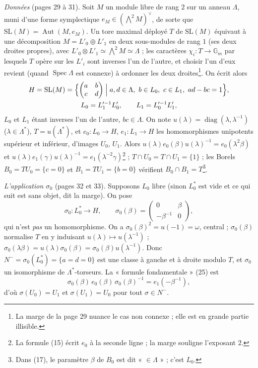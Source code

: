 \documentclass[11pt,a4paper]{article}
\begin{document}
\emph{Données} (pages 29 à 31). Soit $M$ un module libre de rang $2$ sur un
anneau $\Lambda$, muni d'une forme symplectique $e_M \in (\bigwedge^2 M)^{\vee}$,
de sorte que $\mathrm{SL}(M) = \operatorname{Aut}(M, e_M)$. Un tore maximal
déployé $T$ de $\mathrm{SL}(M)$ équivaut à une décomposition $M = L'_0 \oplus
L'_1$ en deux sous-modules de rang $1$ (ses deux droites propres), avec $L'_0
\otimes L'_1 \simeq \bigwedge^2 M \simeq \Lambda$ ; les caractères $\chi_i : T
\to \mathbb{G}_m$ par lesquels $T$ opère sur les $L'_i$ sont inverses l'un de
l'autre, et choisir l'un d'eux revient (quand $\operatorname{Spec}\Lambda$ est
connexe) à ordonner les deux droites\footnote{La marge de la page 29 nuance
le cas non connexe ; elle est en grande partie illisible.}. On écrit alors
\[
  \begin{gathered}
  H = \mathrm{SL}(M) = \Bigl\{\begin{pmatrix} a & b \\ c & d\end{pmatrix} \Bigm|
  a, d \in \Lambda,\ b \in L_0,\ c \in L_1,\ ad - bc = 1\Bigr\},\\
  L_0 = L_1'^{-1}L'_0,\qquad L_1 = L_0'^{-1}L'_1,
  \end{gathered}
\]
$L_0$ et $L_1$ étant inverses l'un de l'autre, $bc \in \Lambda$. On note
$u(\lambda) = \operatorname{diag}(\lambda, \lambda^{-1})$ ($\lambda \in
\Lambda^{*}$), $T = u(\Lambda^{*})$, et $e_0 : L_0 \to H$, $e_1 : L_1 \to H$ les
homomorphismes unipotents supérieur et inférieur, d'images $U_0$, $U_1$. Alors
$u(\lambda)e_0(\beta)u(\lambda)^{-1} = e_0(\lambda^2\beta)$ et
$u(\lambda)e_1(\gamma)u(\lambda)^{-1} = e_1(\lambda^{-2}\gamma)$\footnote{La
formule (15) écrit $e_0$ à la seconde ligne ; la marge souligne l'exposant
$2$.} ; $T \cap U_0 = T \cap U_1 = \{1\}$ ; les Borels $B_0 = TU_0 = \{c = 0\}$
et $B_1 = TU_1 = \{b = 0\}$ vérifient $B_0 \cap B_1 = T$\footnote{Dans (17), le
paramètre $\beta$ de $B_0$ est dit « $\in \Lambda$ » ; c'est $L_0$.}.

\emph{L'application $\sigma_0$} (pages 32 et 33). Supposons $L_0$ libre (sinon
$L_0^{*}$ est vide et ce qui suit est sans objet, dit la marge). On pose
\[
  \sigma_0 : L_0^{*} \to H,\qquad
  \sigma_0(\beta) = \begin{pmatrix} 0 & \beta \\ -\beta^{-1} & 0 \end{pmatrix},
\]
qui n'est \emph{pas} un homomorphisme. On a $\sigma_0(\beta)^2 = u(-1) = \omega$,
central ; $\sigma_0(\beta)$ normalise $T$ en y induisant $u(\lambda) \mapsto
u(\lambda^{-1})$ ; $\sigma_0(\lambda\beta) = u(\lambda)\sigma_0(\beta) =
\sigma_0(\beta)u(\lambda^{-1})$. Donc $N^{-} = \sigma_0(L_0^{*}) = \{a = d =
0\}$ est une classe à gauche et à droite modulo $T$, et $\sigma_0$ un
isomorphisme de $\Lambda^{*}$-torseurs. La « formule fondamentale » (25) est
\[
  \sigma_0(\beta)\,e_0(\beta)\,\sigma_0(\beta)^{-1} = e_1(-\beta^{-1}),
\]
d'où $\sigma(U_0) = U_1$ et $\sigma(U_1) = U_0$ pour tout $\sigma \in N^{-}$.
\end{document}
